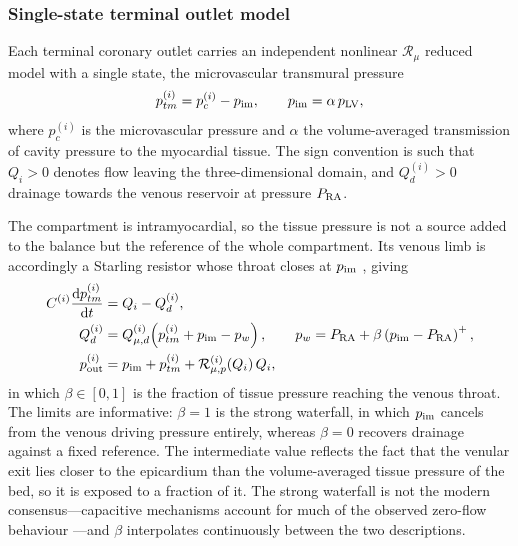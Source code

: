 \documentclass[lineno]{jfm}
\begin{document}
\subsubsection{Single-state terminal outlet model}
\label{sec:coronary-outlet-model}

Each terminal coronary outlet carries an independent nonlinear
$\mathcal{R}_{\mu}$ reduced model with a single state, the microvascular
transmural pressure
\begin{equation}
p_{tm}^{(i)}=p_c^{(i)}-p_{\rm im},
\qquad
p_{\rm im}=\alpha\,p_{\rm LV},
\label{eq:coronary-transmural}
\end{equation}
where $p_c^{(i)}$ is the microvascular pressure and $\alpha$ the
volume-averaged transmission of cavity pressure to the myocardial tissue. The
sign convention is such that $Q_i>0$ denotes flow leaving the
three-dimensional domain, and $Q_{d}^{(i)}>0$ drainage towards the venous
reservoir at pressure $P_{\rm RA}$.

The compartment is intramyocardial, so the tissue pressure is not a source added
to the balance but the reference of the whole compartment. Its venous limb is
accordingly a Starling resistor whose throat closes at $p_{\rm im}$
\citep{Downey1975,Permutt1963}, giving
\begin{align}
C^{(i)}\frac{\mathrm{d}p_{tm}^{(i)}}{\mathrm{d}t}
&=Q_i-Q_{d}^{(i)},
\label{eq:coronary-node-balance}\\
Q_{d}^{(i)}
&=Q_{\mu,d}^{(i)}\!\left(p_{tm}^{(i)}+p_{\rm im}-p_{w}\right),
\qquad
p_{w}=P_{\rm RA}+\beta\left(p_{\rm im}-P_{\rm RA}\right)^{+},
\label{eq:coronary-starling}\\
p_{\rm out}^{(i)}
&=p_{\rm im}+p_{tm}^{(i)}+\mathcal{R}_{\mu,p}^{(i)}\!\left(Q_i\right)Q_i,
\label{eq:coronary-outlet-pressure}
\end{align}
in which $\beta\in[0,1]$ is the fraction of tissue pressure reaching the venous
throat. The limits are informative: $\beta=1$ is the strong waterfall, in which
$p_{\rm im}$ cancels from the venous driving pressure entirely, whereas $\beta=0$
recovers drainage against a fixed reference. The intermediate value reflects the
fact that the venular exit lies closer to the epicardium than the volume-averaged
tissue pressure of the bed, so it is exposed to a fraction of it. The strong
waterfall is not the modern consensus---capacitive mechanisms account for much of
the observed zero-flow behaviour \citep{Spaan1981,Klocke1985,Westerhof2006}---and
$\beta$ interpolates continuously between the two descriptions.
\end{document}
